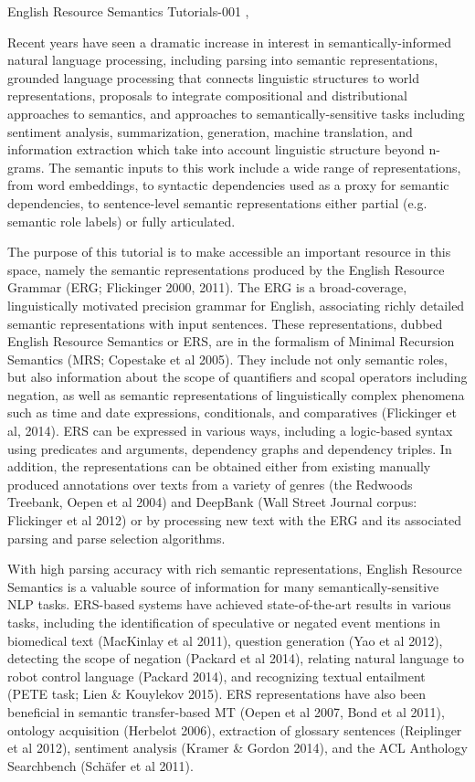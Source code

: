 \begin{tutorial}
  {English Resource Semantics}
  {Tutorials-001}
  {\daydateyear, \tutorialmorningtime}
  {\TutLocA}

Recent years have seen a dramatic increase in interest in semantically-informed natural language processing, including parsing into semantic representations, grounded language processing that connects linguistic structures to world representations, proposals to integrate compositional and distributional approaches to semantics, and approaches to semantically-sensitive tasks including sentiment analysis, summarization, generation, machine translation, and information extraction which take into account linguistic structure beyond n-grams. The semantic inputs to this work include a wide range of representations, from word embeddings, to syntactic dependencies used as a proxy for semantic dependencies, to sentence-level semantic representations either partial (e.g. semantic role labels) or fully articulated.

The purpose of this tutorial is to make accessible an important resource in this space, namely the semantic representations produced by the English Resource Grammar (ERG; Flickinger 2000, 2011). The ERG is a broad-coverage, linguistically motivated precision grammar for English, associating richly detailed semantic representations with input sentences. These representations, dubbed English Resource Semantics or ERS, are in the formalism of Minimal Recursion Semantics (MRS; Copestake et al 2005). They include not only semantic roles, but also information about the scope of quantifiers and scopal operators including negation, as well as semantic representations of linguistically complex phenomena such as time and date expressions, conditionals, and comparatives (Flickinger et al, 2014). ERS can be expressed in various ways, including a logic-based syntax using predicates and arguments, dependency graphs and dependency triples. In addition, the representations can be obtained either from existing manually produced annotations over texts from a variety of genres (the Redwoods Treebank, Oepen et al 2004) and DeepBank (Wall Street Journal corpus: Flickinger et al 2012) or by processing new text with the ERG and its associated parsing and parse selection algorithms.

With high parsing accuracy with rich semantic representations, English Resource Semantics is a valuable source of information for many semantically-sensitive NLP tasks. ERS-based systems have achieved state-of-the-art results in various tasks, including the identification of speculative or negated event mentions in biomedical text (MacKinlay et al 2011), question generation (Yao et al 2012), detecting the scope of negation (Packard et al 2014), relating natural language to robot control language (Packard 2014), and recognizing textual entailment (PETE task; Lien \& Kouylekov 2015). ERS representations have also been beneficial in semantic transfer-based MT (Oepen et al 2007, Bond et al 2011), ontology acquisition (Herbelot 2006), extraction of glossary sentences (Reiplinger et al 2012), sentiment analysis (Kramer \& Gordon 2014), and the ACL Anthology Searchbench (Schäfer et al 2011).


\end{tutorial}
